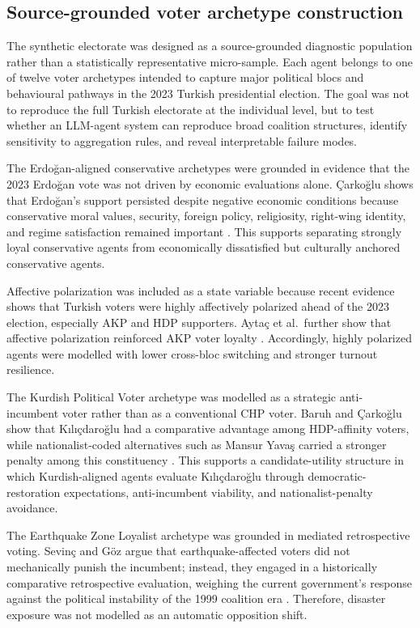 \documentclass[pdflatex,sn-mathphys-num,iicol]{sn-jnl}
\begin{document}
\subsection{Source-grounded voter archetype
construction}\label{subsec:archetypes}

The synthetic electorate was designed as a source-grounded diagnostic
population rather than a statistically representative micro-sample. Each agent
belongs to one of twelve voter archetypes intended to capture major political
blocs and behavioural pathways in the 2023 Turkish presidential election. The
goal was not to reproduce the full Turkish electorate at the individual level,
but to test whether an LLM-agent system can reproduce broad coalition
structures, identify sensitivity to aggregation rules, and reveal interpretable
failure modes.

The Erdoğan-aligned conservative archetypes were grounded in evidence that the
2023 Erdoğan vote was not driven by economic evaluations alone. Çarkoğlu shows
that Erdoğan's support persisted despite negative economic conditions because
conservative moral values, security, foreign policy, religiosity, right-wing
identity, and regime satisfaction remained important \cite{carkoglu2024unlikely}.
This supports separating strongly loyal conservative agents from economically
dissatisfied but culturally anchored conservative agents.

Affective polarization was included as a state variable because recent evidence
shows that Turkish voters were highly affectively polarized ahead of the 2023
election, especially AKP and HDP supporters. Aytaç et al.\ further show that
affective polarization reinforced AKP voter loyalty \cite{aytac2025polarised}.
Accordingly, highly polarized agents were modelled with lower cross-bloc
switching and stronger turnout resilience.

The Kurdish Political Voter archetype was modelled as a strategic anti-incumbent
voter rather than as a conventional CHP voter. Baruh and Çarkoğlu show that
Kılıçdaroğlu had a comparative advantage among HDP-affinity voters, while
nationalist-coded alternatives such as Mansur Yavaş carried a stronger penalty
among this constituency \cite{baruh2024difficult}. This supports a
candidate-utility structure in which Kurdish-aligned agents evaluate
Kılıçdaroğlu through democratic-restoration expectations, anti-incumbent
viability, and nationalist-penalty avoidance.

The Earthquake Zone Loyalist archetype was grounded in mediated retrospective
voting. Sevinç and Göz argue that earthquake-affected voters did not
mechanically punish the incumbent; instead, they engaged in a historically
comparative retrospective evaluation, weighing the current government's
response against the political instability of the 1999 coalition era
\cite{sevinc2024afet}. Therefore, disaster exposure was not modelled as an
automatic opposition shift.
\end{document}
